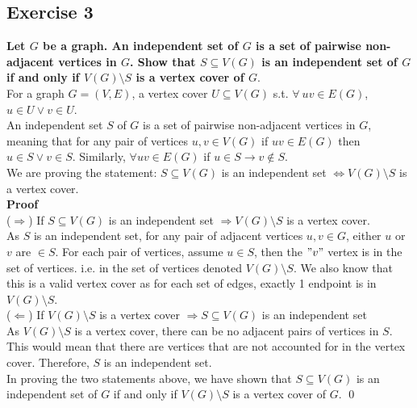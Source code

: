 \subsection*{Exercise 3}
\boldmath
\textbf{Let $G$ be a graph. An independent set of $G$ is a set of pairwise non-adjacent vertices in $G$. Show
that $S \subseteq V(G)$ is an independent set of $G$ if and only if $V (G) \setminus S$ is a vertex cover of $G.$} \\
\unboldmath
\linebreak
For a graph $G = (V, E)$, a vertex cover $U \subseteq V(G)$ s.t. $\forall \: uv \in E(G)$, $u \in U \lor v \in U$. \\
\linebreak 
An independent set $S$ of $G$ is a set of pairwise non-adjacent vertices in $G$, meaning that 
for any pair of vertices $u, v \in V(G)$ if $uv \in E(G)$ then $u \in S \lor v \in S$. Similarly, $\forall uv \in E(G)$ if $u \in S \rightarrow v \notin S$. \\
\linebreak 
We are proving the statement: $S \subseteq V(G)$ is an independent set $\Leftrightarrow V(G) \setminus S$ is a vertex cover. \\
\linebreak 
\textbf{Proof} \\
\linebreak
($\Rightarrow$) If $S \subseteq V(G)$ is an independent set $\Rightarrow V(G) \setminus S$ is a vertex cover. \\
\linebreak 
As $S$ is an independent set, for any pair of adjacent vertices $u, v \in G$, either $u$ or $v$ are $\in S$. For each pair of vertices, assume $u \in S$, then the $"v"$ vertex is in the set of vertices. i.e. in the set of vertices denoted $V(G) \setminus S$. We also know that this is a valid vertex cover as for each set of edges, exactly 1 endpoint is in $V(G) \setminus S$.  \\
\linebreak 
($\Leftarrow$) If $V(G) \setminus S$ is a vertex cover $\Rightarrow S \subseteq V(G)$ is an independent set \\
\linebreak 
As $V(G) \setminus S$ is a vertex cover, there can be no adjacent pairs of vertices in $S$. This would mean that there are vertices that are not accounted for in the vertex cover. Therefore, $S$ is an independent set. \\
\linebreak 
In proving the two statements above, we have shown that $S \subseteq V(G)$ is an independent set of $G$ if and only if $V (G) \setminus S$ is a vertex cover of $G.$
\qed 
